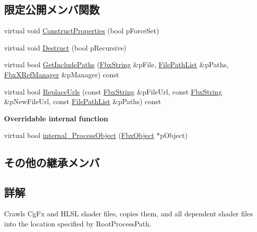 \subsection*{限定公開メンバ関数}
\begin{DoxyCompactItemize}
\item 
virtual void \hyperlink{class_fbx_processor_shader_dependency_a077ea3e1c83d0a42e597c60153fa5e9a}{Construct\+Properties} (bool p\+Force\+Set)
\item 
virtual void \hyperlink{class_fbx_processor_shader_dependency_aba3453491b05632a4972d32a04e8b283}{Destruct} (bool p\+Recursive)
\item 
virtual bool \hyperlink{class_fbx_processor_shader_dependency_a41473d93802b3f628bede8dad500d42c}{Get\+Include\+Paths} (\hyperlink{class_fbx_string}{Fbx\+String} \&p\+File, \hyperlink{class_fbx_processor_shader_dependency_a52e467804857e767f194d73000b08f39}{File\+Path\+List} \&p\+Paths, \hyperlink{class_fbx_x_ref_manager}{Fbx\+X\+Ref\+Manager} \&p\+Manager) const
\item 
virtual bool \hyperlink{class_fbx_processor_shader_dependency_a7b9462bad22d6a5c41474ea4761a2b0e}{Replace\+Urls} (const \hyperlink{class_fbx_string}{Fbx\+String} \&p\+File\+Url, const \hyperlink{class_fbx_string}{Fbx\+String} \&p\+New\+File\+Url, const \hyperlink{class_fbx_processor_shader_dependency_a52e467804857e767f194d73000b08f39}{File\+Path\+List} \&p\+Paths) const
\end{DoxyCompactItemize}
\begin{Indent}\textbf{ Overridable internal function}\par
\begin{DoxyCompactItemize}
\item 
virtual bool \hyperlink{class_fbx_processor_shader_dependency_a4e6d8ee3e0abd220aeeba254f848f147}{internal\+\_\+\+Process\+Object} (\hyperlink{class_fbx_object}{Fbx\+Object} $\ast$p\+Object)
\end{DoxyCompactItemize}
\end{Indent}
\subsection*{その他の継承メンバ}


\subsection{詳解}
Crawls Cg\+Fx and H\+L\+SL shader files, copies them, and all dependent shader files into the location specified by Root\+Process\+Path. 

